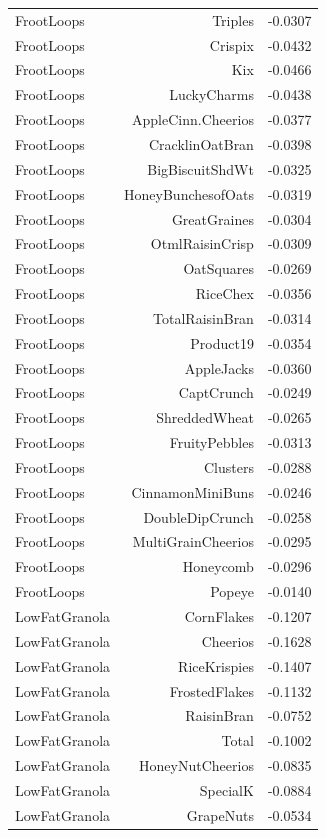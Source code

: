 \begin{longtable}{@{}lrr@{}}
FrootLoops & Triples & -0.0307 \\
FrootLoops & Crispix & -0.0432 \\
FrootLoops & Kix & -0.0466 \\
FrootLoops & LuckyCharms & -0.0438 \\
FrootLoops & AppleCinn.Cheerios & -0.0377 \\
FrootLoops & CracklinOatBran & -0.0398 \\
FrootLoops & BigBiscuitShdWt & -0.0325 \\
FrootLoops & HoneyBunchesofOats & -0.0319 \\
FrootLoops & GreatGraines & -0.0304 \\
FrootLoops & OtmlRaisinCrisp & -0.0309 \\
FrootLoops & OatSquares & -0.0269 \\
FrootLoops & RiceChex & -0.0356 \\
FrootLoops & TotalRaisinBran & -0.0314 \\
FrootLoops & Product19 & -0.0354 \\
FrootLoops & AppleJacks & -0.0360 \\
FrootLoops & CaptCrunch & -0.0249 \\
FrootLoops & ShreddedWheat & -0.0265 \\
FrootLoops & FruityPebbles & -0.0313 \\
FrootLoops & Clusters & -0.0288 \\
FrootLoops & CinnamonMiniBuns & -0.0246 \\
FrootLoops & DoubleDipCrunch & -0.0258 \\
FrootLoops & MultiGrainCheerios & -0.0295 \\
FrootLoops & Honeycomb & -0.0296 \\
FrootLoops & Popeye & -0.0140 \\
LowFatGranola & CornFlakes & -0.1207 \\
LowFatGranola & Cheerios & -0.1628 \\
LowFatGranola & RiceKrispies & -0.1407 \\
LowFatGranola & FrostedFlakes & -0.1132 \\
LowFatGranola & RaisinBran & -0.0752 \\
LowFatGranola & Total & -0.1002 \\
LowFatGranola & HoneyNutCheerios & -0.0835 \\
LowFatGranola & SpecialK & -0.0884 \\
LowFatGranola & GrapeNuts & -0.0534 \\

\end{longtable}
